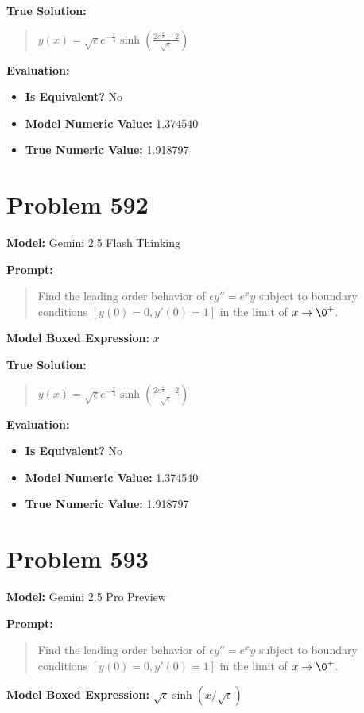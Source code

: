 \documentclass{article}
\begin{document}
\textbf{True Solution:}
\begin{quote}
$y(x) = \sqrt{\epsilon} e^{-\frac{x}{4}}\sinh(\frac{2e^{\frac{x}{2}}-2}{\sqrt{\epsilon}})$
\end{quote}

\textbf{Evaluation:}
\begin{itemize}
\item \textbf{Is Equivalent?} No
\item \textbf{Model Numeric Value:} 1.374540
\item \textbf{True Numeric Value:} 1.918797
\end{itemize}
\vspace{1cm}
\section*{Problem 592}
\textbf{Model:} Gemini 2.5 Flash Thinking

\textbf{Prompt:}
\begin{quote}
Find the leading order behavior of $\epsilon y'' = e^xy$ subject to boundary conditions $[y(0) = 0, y'(0) = 1]$ in the limit of $x\to\0^+$.
\end{quote}
\textbf{Model Boxed Expression:} $x$

\textbf{True Solution:}
\begin{quote}
$y(x) = \sqrt{\epsilon} e^{-\frac{x}{4}}\sinh(\frac{2e^{\frac{x}{2}}-2}{\sqrt{\epsilon}})$
\end{quote}

\textbf{Evaluation:}
\begin{itemize}
\item \textbf{Is Equivalent?} No
\item \textbf{Model Numeric Value:} 1.374540
\item \textbf{True Numeric Value:} 1.918797
\end{itemize}
\vspace{1cm}
\section*{Problem 593}
\textbf{Model:} Gemini 2.5 Pro Preview

\textbf{Prompt:}
\begin{quote}
Find the leading order behavior of $\epsilon y'' = e^xy$ subject to boundary conditions $[y(0) = 0, y'(0) = 1]$ in the limit of $x\to\0^+$.
\end{quote}
\textbf{Model Boxed Expression:} $\sqrt{\epsilon}\sinh(x/\sqrt{\epsilon})$
\end{document}
